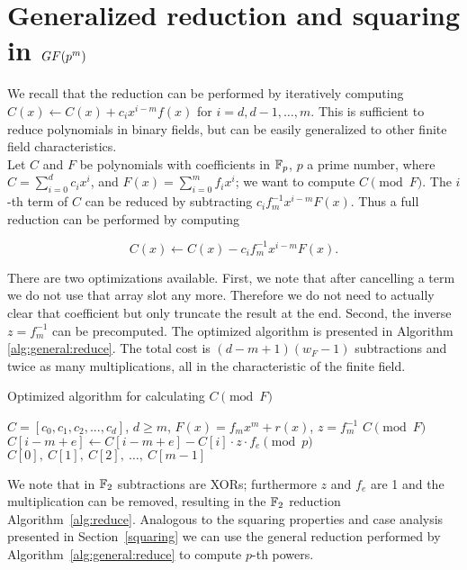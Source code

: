 \section{Generalized reduction and squaring in $GF(\MakeLowercase{p}^\MakeLowercase{m})$} \label{pth}

We recall that the reduction can be performed by iteratively computing $C(x) \leftarrow C(x) + c_{i} x^{i-m} f(x)$ for $i = d, d-1, \ldots, m$. This is sufficient to reduce polynomials in binary fields, but can be easily generalized to other finite field characteristics. \\

Let $C$ and $F$ be polynomials with coefficients in $\mathbb{F}_p$, $p$ a prime number, where $C = \sum_{i=0}^d c_i x^i$, and $F(x) = \sum_{i=0}^m f_i x^i$; we want to compute $C \pmod F$. The $i$-th term of $C$ can be reduced by subtracting $c_i f_m^{-1} x^{i-m} F(x)$. Thus a full reduction can be performed by computing

$$C(x) \leftarrow C(x) - c_i f_m^{-1} x^{i-m} F(x).$$

There are two optimizations available. First, we note that after cancelling a term we do not use that array slot any more. Therefore we do not need to actually clear that coefficient but only truncate the result at the end. Second, the inverse $z = f_m^{-1}$ can be precomputed. The optimized algorithm is presented in Algorithm \ref{alg:general:reduce}. The total cost is $(d-m+1) (w_F-1)$ subtractions and twice as many multiplications, all in the characteristic of the finite field. \\

\begin{algorithm}
\caption{Optimized algorithm for calculating $C \pmod F$}
\label{alg:general:reduce}
\begin{algorithmic}[1]
    \REQUIRE $C = [c_0, c_1, c_2, ..., c_d]$, $d \geq m$, $F(x) = f_m x^m + r(x)$, $z = f_m^{-1}$
    \ENSURE $C \pmod F$
            \STATE $C[i-m+e] \leftarrow C[i-m+e] - C[i] \cdot z \cdot f_e \pmod p$
        \ENDFOR
    \ENDFOR
    \RETURN $C[0],~C[1],~C[2],~\ldots,~C[m-1]$
\end{algorithmic}
\end{algorithm}

We note that in $\mathbb{F}_2$ subtractions are XORs; furthermore $z$ and $f_e$ are 1 and the multiplication can be removed, resulting in the $\mathbb{F}_2$ reduction Algorithm~\ref{alg:reduce}. Analogous to the squaring properties and case analysis presented in Section~\ref{squaring} we can use the general reduction performed by Algorithm~\ref{alg:general:reduce} to compute $p$-th powers. \\

